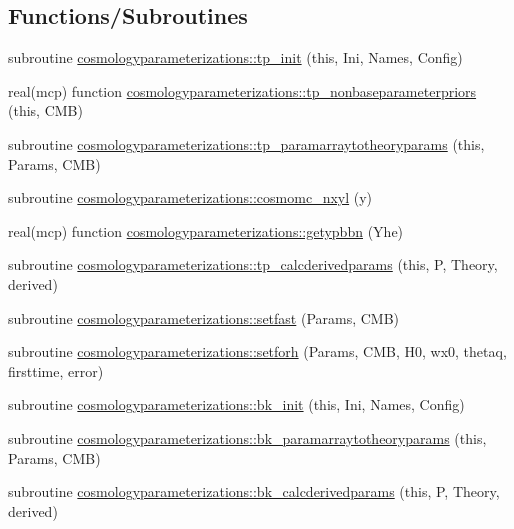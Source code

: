 \subsection*{Functions/\+Subroutines}
\begin{DoxyCompactItemize}
\item 
subroutine \mbox{\hyperlink{namespacecosmologyparameterizations_aa546897820fdf873fd19e45f5fe496e3}{cosmologyparameterizations\+::tp\+\_\+init}} (this, Ini, Names, Config)
\item 
real(mcp) function \mbox{\hyperlink{namespacecosmologyparameterizations_a7fdf867e0581b872103682d4364bc00c}{cosmologyparameterizations\+::tp\+\_\+nonbaseparameterpriors}} (this, C\+MB)
\item 
subroutine \mbox{\hyperlink{namespacecosmologyparameterizations_afad6169e49a1cd77b2d4aa147b2db537}{cosmologyparameterizations\+::tp\+\_\+paramarraytotheoryparams}} (this, Params, C\+MB)
\item 
subroutine \mbox{\hyperlink{namespacecosmologyparameterizations_ae660404b993706170ddf14a2a0904812}{cosmologyparameterizations\+::cosmomc\+\_\+nxyl}} (y)
\item 
real(mcp) function \mbox{\hyperlink{namespacecosmologyparameterizations_a211ef353fd86e7f656da5d1ee63e96de}{cosmologyparameterizations\+::getypbbn}} (Yhe)
\item 
subroutine \mbox{\hyperlink{namespacecosmologyparameterizations_aeedc92b3479b3427db06f0770e7c13c0}{cosmologyparameterizations\+::tp\+\_\+calcderivedparams}} (this, P, Theory, derived)
\item 
subroutine \mbox{\hyperlink{namespacecosmologyparameterizations_a125ded7f9054c23924b78956a86e21af}{cosmologyparameterizations\+::setfast}} (Params, C\+MB)
\item 
subroutine \mbox{\hyperlink{namespacecosmologyparameterizations_a4269c5d3027267744bdf4404d32a9db0}{cosmologyparameterizations\+::setforh}} (Params, C\+MB, H0, wx0, thetaq, firsttime, error)
\item 
subroutine \mbox{\hyperlink{namespacecosmologyparameterizations_a8bcd41b19d9c19fa07665660352182b8}{cosmologyparameterizations\+::bk\+\_\+init}} (this, Ini, Names, Config)
\item 
subroutine \mbox{\hyperlink{namespacecosmologyparameterizations_a24c7011e1628164c2a2742b41a0fd48e}{cosmologyparameterizations\+::bk\+\_\+paramarraytotheoryparams}} (this, Params, C\+MB)
\item 
subroutine \mbox{\hyperlink{namespacecosmologyparameterizations_a70a404faf744a903a55fc6444af6863c}{cosmologyparameterizations\+::bk\+\_\+calcderivedparams}} (this, P, Theory, derived)
\end{DoxyCompactItemize}
